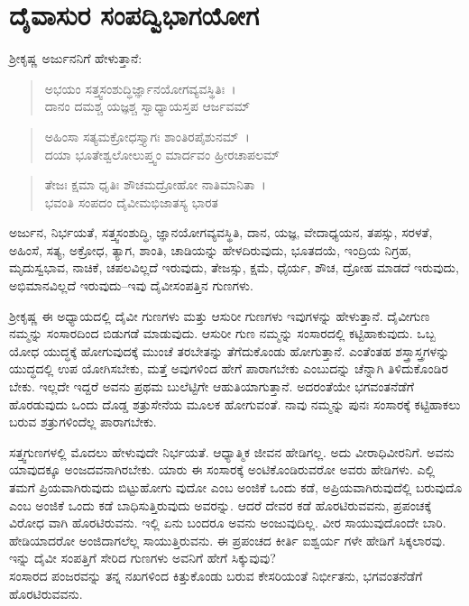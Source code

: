 
\chapter{ದೈವಾಸುರ ಸಂಪದ್ವಿಭಾಗಯೋಗ}

ಶ‍್ರೀಕೃಷ್ಣ ಅರ್ಜುನನಿಗೆ ಹೇಳುತ್ತಾನೆ:

\begin{verse}
ಅಭಯಂ ಸತ್ತ್ವಸಂಶುದ್ಧಿರ್ಜ್ಞಾನಯೋಗವ್ಯವಸ್ಥಿತಿಃ~।\\ದಾನಂ ದಮಶ್ಚ ಯಜ್ಞಶ್ಚ ಸ್ವಾಧ್ಯಾಯಸ್ತಪ ಆರ್ಜವಮ್ 
\end{verse}

\begin{verse}
ಅಹಿಂಸಾ ಸತ್ಯಮಕ್ರೋಧಸ್ತ್ಯಾಗಃ ಶಾಂತಿರಪೈಶುನಮ್~।\\ದಯಾ ಭೂತೇಶ್ವಲೋಲುಪ್ತ್ವಂ ಮಾರ್ದವಂ ಹ್ರೀರಚಾಪಲಮ್ 
\end{verse}

\begin{verse}
ತೇಜಃ ಕ್ಷಮಾ ಧೃತಿಃ ಶೌಚಮದ್ರೋಹೋ ನಾತಿಮಾನಿತಾ~।\\ಭವಂತಿ ಸಂಪದಂ ದೈವೀಮಭಿಜಾತಸ್ಯ ಭಾರತ 
\end{verse}

{\small ಅರ್ಜುನ, ನಿರ್ಭಯತೆ, ಸತ್ತ್ವಸಂಶುದ್ಧಿ, ಜ್ಞಾನಯೋಗವ್ಯವಸ್ಥಿತಿ, ದಾನ, ಯಜ್ಞ, ವೇದಾಧ್ಯಯನ, ತಪಸ್ಸು, ಸರಳತೆ, ಅಹಿಂಸೆ, ಸತ್ಯ, ಅಕ್ರೋಧ, ತ್ಯಾಗ, ಶಾಂತಿ, ಚಾಡಿಯನ್ನು ಹೇಳದಿರುವುದು, ಭೂತದಯೆ, ಇಂದ್ರಿಯ ನಿಗ್ರಹ, ಮೃದುಸ್ವಭಾವ, ನಾಚಿಕೆ, ಚಪಲವಿಲ್ಲದೆ ಇರುವುದು, ತೇಜಸ್ಸು, ಕ್ಷಮೆ, ಧೈರ್ಯ, ಶೌಚ, ದ್ರೋಹ ಮಾಡದೆ ಇರುವುದು, ಅಭಿಮಾನವಿಲ್ಲದೆ ಇರುವುದು–ಇವು ದೈವೀಸಂಪತ್ತಿನ ಗುಣಗಳು.}

ಶ‍್ರೀಕೃಷ್ಣ ಈ ಅಧ್ಯಾಯದಲ್ಲಿ ದೈವೀ ಗುಣಗಳು ಮತ್ತು ಆಸುರೀ ಗುಣಗಳು ಇವುಗಳನ್ನು ಹೇಳುತ್ತಾನೆ. ದೈವೀಗುಣ ನಮ್ಮನ್ನು ಸಂಸಾರದಿಂದ ಬಿಡುಗಡೆ ಮಾಡುವುದು. ಆಸುರೀ ಗುಣ ನಮ್ಮನ್ನು ಸಂಸಾರದಲ್ಲಿ ಕಟ್ಟಿಹಾಕುವುದು. ಒಬ್ಬ ಯೋಧ ಯುದ್ಧಕ್ಕೆ ಹೋಗುವುದಕ್ಕೆ ಮುಂಚೆ ತರಬೇತನ್ನು ತೆಗೆದುಕೊಂಡು ಹೋಗುತ್ತಾನೆ. ಎಂತೆಂತಹ ಶಸ್ತ್ರಾಸ್ತ್ರಗಳನ್ನು ಯುದ್ಧದಲ್ಲಿ ಉಪ ಯೋಗಿಸಬೇಕು, ಮತ್ತೆ ಅವುಗಳಿಂದ ಹೇಗೆ ಪಾರಾಗಬೇಕು ಎಂಬುದನ್ನು ಚೆನ್ನಾಗಿ ತಿಳಿದುಕೊಂಡಿರ ಬೇಕು. ಇಲ್ಲದೇ ಇದ್ದರೆ ಅವನು ಪ್ರಥಮ ಬುಲೆಟ್ಟಿಗೇ ಆಹುತಿಯಾಗುತ್ತಾನೆ. ಅದರಂತೆಯೇ ಭಗವಂತನೆಡೆಗೆ ಹೊರಡುವುದು ಒಂದು ದೊಡ್ಡ ಶತ್ರುಸೇನೆಯ ಮೂಲಕ ಹೋಗುವಂತೆ. ನಾವು ನಮ್ಮನ್ನು ಪುನಃ ಸಂಸಾರಕ್ಕೆ ಕಟ್ಟಿಹಾಕಲು ಬರುವ ಶತ್ರುಗಳಿಂದೆಲ್ಲ ಪಾರಾಗಬೇಕು.

ಸತ್ತ್ವಗುಣಗಳಲ್ಲಿ ಮೊದಲು ಹೇಳುವುದೇ ನಿರ್ಭಯತೆ. ಆಧ್ಯಾತ್ಮಿಕ ಜೀವನ ಹೇಡಿಗಲ್ಲ. ಅದು ವೀರಾಧಿವೀರನಿಗೆ. ಅವನು ಯಾವುದಕ್ಕೂ ಅಂಜದವನಾಗಿರಬೇಕು. ಯಾರು ಈ ಸಂಸಾರಕ್ಕೆ ಅಂಟಿಕೊಂಡಿರುವರೋ ಅವರು ಹೇಡಿಗಳು. ಎಲ್ಲಿ ತಮಗೆ ಪ್ರಿಯವಾಗಿರುವುದು ಬಿಟ್ಟುಹೋಗು ವುದೋ ಎಂಬ ಅಂಜಿಕೆ ಒಂದು ಕಡೆ, ಅಪ್ರಿಯವಾಗಿರುವುದೆಲ್ಲಿ ಬರುವುದೊ ಎಂಬ ಅಂಜಿಕೆ ಒಂದು ಕಡೆ ಬಾಧಿಸುತ್ತಿರುವುದು ಅವರನ್ನು. ಆದರೆ ದೇವರ ಕಡೆ ಹೊರಟಿರುವವನು, ಪ್ರಪಂಚಕ್ಕೆ ವಿರೋಧ ವಾಗಿ ಹೊರಟಿರುವನು. ಇಲ್ಲಿ ಏನು ಬಂದರೂ ಅವನು ಅಂಜುವುದಿಲ್ಲ. ವೀರ ಸಾಯುವುದೊಂದೇ ಬಾರಿ. ಹೇಡಿಯಾದರೋ ಅಂಜಿದಾಗಲೆಲ್ಲ ಸಾಯುತ್ತಿರುವನು. ಈ ಪ್ರಪಂಚದ ಕೀರ್ತಿ ಐಶ್ವರ್ಯ ಗಳೇ ಹೇಡಿಗೆ ಸಿಕ್ಕಲಾರವು. ಇನ್ನು ದೈವೀ ಸಂಪತ್ತಿಗೆ ಸೇರಿದ ಗುಣಗಳು ಅವನಿಗೆ ಹೇಗೆ ಸಿಕ್ಕುವುವು?\\ಸಂಸಾರದ ಪಂಜರವನ್ನು ತನ್ನ ನಖಗಳಿಂದ ಕಿತ್ತುಕೊಂಡು ಬರುವ ಕೇಸರಿಯಂತೆ ನಿರ್ಭೀತನು, ಭಗವಂತನೆಡೆಗೆ ಹೊರಟಿರುವವನು.

